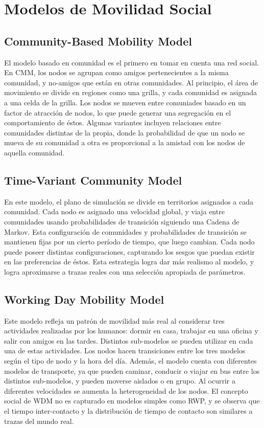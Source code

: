 \section{Modelos de Movilidad Social}

\subsection{Community-Based Mobility Model}

El modelo basado en comunidad es el primero en tomar en cuenta una red social. En CMM, los nodos se agrupan como amigos pertenecientes a la misma comunidad, y no-amigos que están en otras comunidades. Al principio, el área de movimiento se divide en regiones como una grilla, y cada comunidad es asignada a una celda de la grilla. Los nodos se mueven entre comuniades basado en un factor de atracción de nodos, lo que puede generar una segregación en el comportamiento de éstos. Algunas variantes incluyen relaciones entre comunidades distintas de la propia, donde la probabilidad de que un nodo se mueva de su comunidad a otra es proporcional a la amistad con los nodos de aquella comunidad.

\subsection{Time-Variant Community Model}

En este modelo, el plano de simulación se divide en territorios asignados a cada comunidad. Cada nodo es asignado una velocidad global, y viaja entre comunidades usando probabilidades de transición siguiendo una Cadena de Markov. Esta configuración de comunidades y probabilidades de transición se mantienen fijas por un cierto período de tiempo, que luego cambian. Cada nodo puede poseer distintas configuraciones, capturando los sesgos que puedan existir en las preferencias de éstos. Esta estrategia logra dar más realismo al modelo, y logra aproximarse a trazas reales con una selección apropiada de parámetros.

\subsection{Working Day Mobility Model}
 
Este modelo refleja un patrón de movilidad más real al considerar tres actividades realizadas por los humanos: dormir en casa, trabajar en una oficina y salir con amigos en las tardes. Distintos sub-modelos se pueden utilizar en cada una de estas actividades. Los nodos hacen transiciones entre los tres modelos según el tipo de nodo y la hora del día. Además, el modelo cuenta con diferentes modelos de transporte, ya que pueden caminar, conducir o viajar en bus entre los distintos sub-modelos, y pueden moverse aislados o en grupo. Al ocurrir a diferentes velocidades se aumenta la heterogeneidad de los nodos. El concepto social de WDM no es capturado en modelos simples como RWP, y se observa que el tiempo inter-contacto y la distribución de tiempo de contacto son similares a trazas del mundo real.

